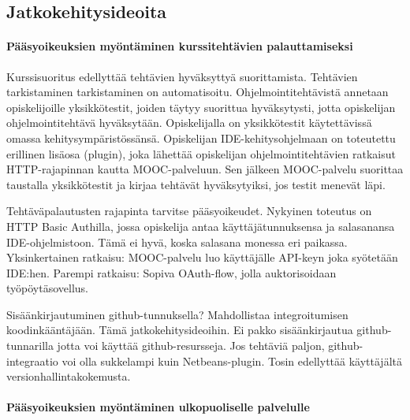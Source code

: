 \documentclass[finnish,gradu]{tktltiki}
\begin{document}

  \subsection{Jatkokehitysideoita} %
  \label{sub:jatkokehitysideoita}

  \paragraph{Pääsyoikeuksien myöntäminen kurssitehtävien palauttamiseksi} \hfill %
  \label{par:pääsyoikeuksien_myöntäminen_ohjelmakoodin_palauttamiseksi}

    Kurssisuoritus edellyttää tehtävien hyväksyttyä suorittamista. Tehtävien tarkistaminen tarkistaminen on automatisoitu. Ohjelmointitehtävistä annetaan opiskelijoille yksikkötestit, joiden täytyy suorittua hyväksytysti, jotta opiskelijan ohjelmointitehtävä hyväksytään. Opiskelijalla on yksikkötestit käytettävissä omassa kehitysympäristössänsä. Opiskelijan IDE-kehitysohjelmaan on toteutettu erillinen lisäosa (plugin), joka lähettää opiskelijan ohjelmointitehtävien ratkaisut HTTP-rajapinnan kautta MOOC-palveluun. Sen jälkeen MOOC-palvelu suorittaa taustalla yksikkötestit ja kirjaa tehtävät hyväksytyiksi, jos testit menevät läpi.

    Tehtäväpalautusten rajapinta tarvitse pääsyoikeudet. Nykyinen toteutus on HTTP Basic Authilla, jossa opiskelija antaa käyttäjätunnuksensa ja salasanansa IDE-ohjelmistoon. Tämä ei hyvä, koska salasana monessa eri paikassa. Yksinkertainen ratkaisu: MOOC-palvelu luo käyttäjälle API-keyn joka syötetään IDE:hen. Parempi ratkaisu: Sopiva OAuth-flow, jolla auktorisoidaan työpöytäsovellus.

    Sisäänkirjautuminen github-tunnuksella? Mahdollistaa integroitumisen koodinkääntäjään. Tämä jatkokehitysideoihin. Ei pakko sisäänkirjautua github-tunnarilla jotta voi käyttää github-resursseja. Jos tehtäviä paljon, github-integraatio voi olla sukkelampi kuin Netbeans-plugin. Tosin edellyttää käyttäjältä versionhallintakokemusta.


  \paragraph{Pääsyoikeuksien myöntäminen ulkopuoliselle palvelulle} \hfill %
  \label{par:pääsyoikeuksien_myöntäminen_ulkopuoliselle_palvelulle}
\end{document}
